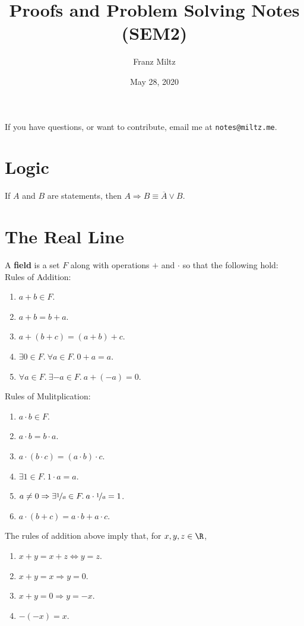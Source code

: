 \documentclass{article}
\begin{document}
\title{Proofs and Problem Solving Notes (SEM2)}
\author{Franz Miltz}
\date{May 28, 2020}
\maketitle
\noindent If you have questions, or want to contribute, email me at \texttt{notes@miltz.me}.
\mkthms
\tableofcontents
\pagebreak
\section{Logic}
\begin{theorem}
	If $A$ and $B$ are statements, then $A\Rightarrow B\equiv \overline{A}\vee B$.
\end{theorem}
\section{The Real Line}
\begin{definition}
	A \textbf{field} is a set $F$ along with operations $+$ and $\cdot$ so that the following hold:\\
	Rules of Addition:
	\begin{enumerate}
		\item $a+b\in F$.
		\item $a+b = b+a$.
		\item $a+(b+c) = (a+b)+c$.
		\item $\exists 0\in F.\: \forall a\in F.\: 0+a=a$.
		\item $\forall a\in F.\: \exists -a\in F.\: a+(-a)=0$.
	\end{enumerate}
	Rules of Mulitplication:
	\begin{enumerate}
		\item $a\cdot b \in F$.
		\item $a\cdot b = b\cdot a$.
		\item $a\cdot(b\cdot c)=(a\cdot b)\cdot c$.
		\item $\exists 1\in F.\: 1\cdot a = a$.
		\item $a\not=0\Rightarrow\exists \nicefrac{1}{a}\in F.\: a\cdot\nicefrac{1}{a}=1$.
		\item $a\cdot (b+c) = a\cdot b + a\cdot c$.
	\end{enumerate}
\end{definition}
\begin{theorem}
	The rules of addition above imply that, for $x,y,z\in \R$,
	\begin{enumerate}
		\item $x+y=x+z\Leftrightarrow y=z$.
		\item $x+y=x\Rightarrow y=0$.
		\item $x+y=0\Rightarrow y=-x$.
		\item $-(-x)=x$.
	\end{enumerate}
\end{theorem}
\end{document}

